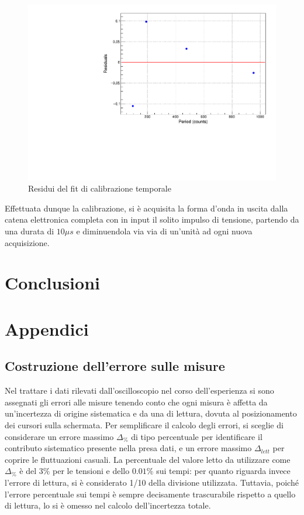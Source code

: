 \documentclass{article}
\begin{document}
\begin{center}
\begin{figure}[H]
\centering
\includegraphics[scale=0.4, angle=0]{calibtempiresidui.pdf}
\caption{Residui del fit di calibrazione temporale}
\label{fig:calibtempiresidui}
\end{figure}
\end{center}


Effettuata dunque la calibrazione, si è acquisita la forma d'onda in uscita dalla catena elettronica completa con in input il solito
impulso di tensione, partendo da una durata di $10 \mu s$ e diminuendola via via di un'unità ad ogni nuova acquisizione.

\section{Conclusioni}

\appendix
\section{Appendici}
\label{appendice}
\subsection{Costruzione dell'errore sulle misure}
\label{Calcerr}

Nel trattare i dati rilevati dall'oscilloscopio nel corso dell'esperienza si sono assegnati gli errori alle misure tenendo conto che ogni misura è affetta da un'incertezza di origine sistematica e da una di lettura, dovuta al posizionamento dei cursori sulla schermata. Per semplificare il calcolo degli errori, si sceglie di considerare un errore massimo $\Delta_{\%}$ di tipo percentuale per identificare il contributo sistematico presente nella presa dati, e un errore massimo $\Delta_{lett}$ per coprire le fluttuazioni casuali. La percentuale del valore letto da utilizzare come $\Delta_{\%}$ è del $3\%$ per le tensioni e dello $0.01\%$ sui tempi: per quanto riguarda invece l'errore di lettura, si è considerato 1/10 della divisione utilizzata.
Tuttavia, poiché l'errore percentuale sui tempi è sempre decisamente trascurabile rispetto a quello di lettura, lo si è omesso nel calcolo dell'incertezza totale.
\end{document}
